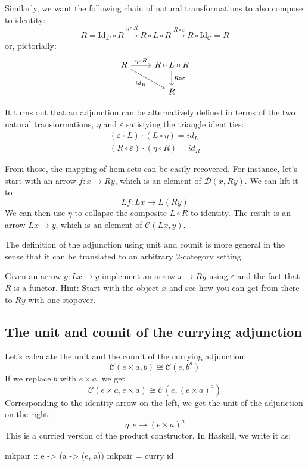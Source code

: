 \documentclass[DaoFP]{subfiles}
\begin{document}
Similarly, we want the following chain of natural transformations to also compose to identity:
\[ R = \text{Id}_{\mathcal{D}} \circ R \xrightarrow{\eta \circ R} R \circ L \circ R \xrightarrow{R \circ \varepsilon} R \circ \text{Id}_{\mathcal{C}} = R \]
or, pictorially:
\[
 \begin{tikzcd}
 R
 \arrow[r, "\eta \circ R"]
 \arrow[rd, "id_R"']
 & R \circ L \circ R
 \arrow[d, "R \circ \varepsilon"]
 \\
 & R
  \end{tikzcd}
\]

It turns out that an adjunction can be alternatively defined in terms of the two natural transformations, $\eta$ and $\varepsilon$ satisfying the  triangle identities:
\begin{align*}
(\varepsilon \circ L) \cdot (L \circ \eta) = id_L \\
(R \circ \varepsilon) \cdot (\eta \circ R) = id_R
\end{align*}

From those, the mapping of hom-sets can be easily recovered. For instance, let's start with an arrow $f \colon x \to R y$, which is an element of $\mathcal{D}( x , R y)$. We can lift it to 
\[L f \colon L x \to L (R y)\]
We can then use $\eta$ to collapse the composite $L \circ R$ to identity. The result is an arrow $L x \to y$, which is an element of $ \mathcal{C} (L x, y)$.


The definition of the adjunction using unit and counit is more general in the sense that it can be translated to an arbitrary 2-category setting. 

\begin{exercise}
Given an arrow $g \colon L x \to y$ implement an arrow $x \to R y$ using $\varepsilon$ and the fact that $R$ is a functor. Hint: Start with the object $x$ and see how you can get from there to $R y$ with one stopover.
\end{exercise}

\subsection{The unit and counit of the currying adjunction}

Let's calculate the unit and the counit of the currying adjunction:
\[  \mathcal{C}(e \times a, b ) \cong  \mathcal{C} (e, b^a)  \]
If we replace $b$ with $e \times a$, we get
\[  \mathcal{C}(e \times a, e \times a ) \cong  \mathcal{C} (e, (e \times a)^a)  \]
Corresponding to the identity arrow on the left, we get the unit of the adjunction on the right:
\[ \eta \colon e \to (e \times a)^a \]
This is a curried version of the product constructor. In Haskell, we write it as:
\begin{haskell}
mkpair :: e -> (a -> (e, a))
mkpair = curry id
\end{haskell}
\end{document}
